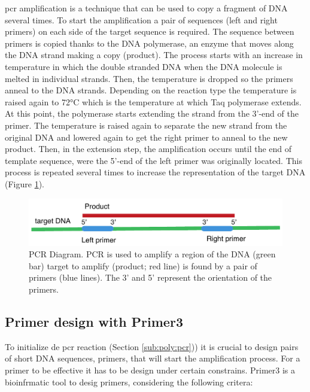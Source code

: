 \Gls{pcr} amplification is a technique that can be used to copy a fragment of DNA several times. 
To start the amplification a pair of sequences (left and right primers) on each side of the target sequence is required. 
The sequence between primers is copied thanks to the DNA polymerase, an enzyme that moves along the DNA strand making a copy (product). 
The process starts with an increase in temperature in which the double stranded DNA when the DNA molecule is melted in individual strands. 
Then, the temperature is dropped so the primers anneal to the DNA strands. 
Depending on the reaction type the temperature is raised again to 72°C which is the temperature at which Taq polymerase extends. 
At this point, the polymerase starts extending the strand from the 3'-end of the primer. 
The temperature is raised again to separate the new strand from the original DNA and lowered again to get the right primer to anneal to the new product.
Then, in the extension step, the amplification occurs until the end of template sequence, were the 5'-end of the left primer was originally located. 
This process is repeated several times to increase the representation of the target DNA (Figure \ref{fig:poly:amplificationProduct}).  

\begin{figure}
\includegraphics[width=1\textwidth]{PolyMarker/Figures/intro/amplificationProduct.pdf}
\caption[PCR Diagram]{PCR Diagram. PCR is used to amplify a region of the DNA (green bar) target to amplify (product; red line) is found by a pair of primers (blue lines). The 3' and 5' represent the orientation of the primers.}
\label{fig:poly:amplificationProduct}
\end{figure}

\subsection{Primer design with Primer3}
\label{sub:poly:primer3}
To initialize de \gls{pcr} reaction (Section \ref{sub:poly:pcr})) it is crucial to design pairs of short DNA sequences, primers, that will start the amplification process. 
For a primer to be effective it has to be design under certain constrains. 
Primer3 \citep{Untergasser2012} is a bioinfrmatic tool to desig primers, considering the following critera:


